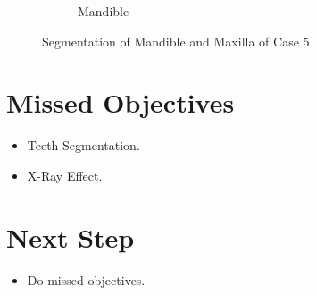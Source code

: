 \documentclass[11pt, b5paper]{article}
\begin{document}
\begin{figure}
\begin{subfigure}[b]{0.75\textwidth}
        \caption{Mandible}
    \end{subfigure}
    \caption{Segmentation of Mandible and Maxilla of Case 5}
    \label{fig:C5}
\end{figure}



\section{Missed Objectives}
\begin{itemize}
\item Teeth Segmentation.
\item X-Ray Effect.
\end{itemize}

\section{Next Step}
\begin{itemize}
\item Do missed objectives.
\end{itemize}
\end{document}
